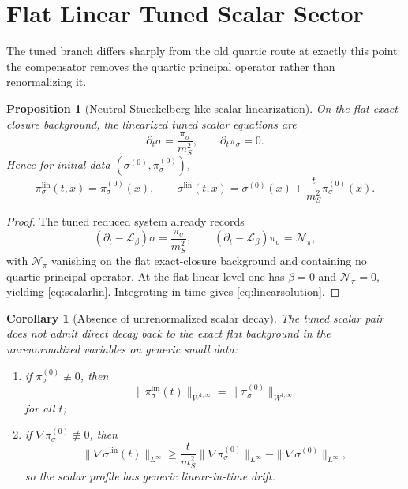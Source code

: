 \documentclass[11pt]{article}
\newcommand{\Ell}{\mathcal{L}}
\newtheorem{proposition}{Proposition}
\newtheorem{corollary}{Corollary}
\begin{document}
\section{Flat Linear Tuned Scalar Sector}

The tuned branch differs sharply from the old quartic route at exactly this point: the compensator removes the quartic principal operator rather than renormalizing it.

\begin{proposition}[Neutral Stueckelberg-like scalar linearization]
\label{prop:scalarlin}
On the flat exact-closure background, the linearized tuned scalar equations are
\begin{equation}
\partial_t \sigma = \frac{\pi_\sigma}{m_S^2},
\qquad
\partial_t\pi_\sigma = 0.
\label{eq:scalarlin}
\end{equation}
Hence for initial data \((\sigma^{(0)},\pi_\sigma^{(0)})\),
\begin{equation}
\pi_\sigma^{\mathrm{lin}}(t,x)=\pi_\sigma^{(0)}(x),
\qquad
\sigma^{\mathrm{lin}}(t,x)
=
\sigma^{(0)}(x)
+\frac{t}{m_S^2}\pi_\sigma^{(0)}(x).
\label{eq:linearsolution}
\end{equation}
\end{proposition}

\begin{proof}
The tuned reduced system already records
\[
(\partial_t-\Ell_\beta)\sigma=\frac{\pi_\sigma}{m_S^2},
\qquad
(\partial_t-\Ell_\beta)\pi_\sigma=\mathcal N_\pi,
\]
with \(\mathcal N_\pi\) vanishing on the flat exact-closure background and containing no quartic principal operator. At the flat linear level one has \(\beta=0\) and \(\mathcal N_\pi=0\), yielding \eqref{eq:scalarlin}. Integrating in time gives \eqref{eq:linearsolution}.
\end{proof}

\begin{corollary}[Absence of unrenormalized scalar decay]
\label{cor:noscalardecay}
The tuned scalar pair does not admit direct decay back to the exact flat background in the unrenormalized variables on generic small data:
\begin{enumerate}
    \item if \(\pi_\sigma^{(0)}\not\equiv 0\), then
    \begin{equation}
    \|\pi_\sigma^{\mathrm{lin}}(t)\|_{W^{1,\infty}}
    =
    \|\pi_\sigma^{(0)}\|_{W^{1,\infty}}
    \label{eq:pinodecay}
    \end{equation}
    for all \(t\);
    \item if \(\nabla\pi_\sigma^{(0)}\not\equiv 0\), then
    \begin{equation}
    \|\nabla\sigma^{\mathrm{lin}}(t)\|_{L^\infty}
    \ge
    \frac{t}{m_S^2}\|\nabla\pi_\sigma^{(0)}\|_{L^\infty}
    - \|\nabla\sigma^{(0)}\|_{L^\infty},
    \label{eq:sigmagrowth}
    \end{equation}
    so the scalar profile has generic linear-in-time drift.
\end{enumerate}
\end{corollary}
\end{document}
